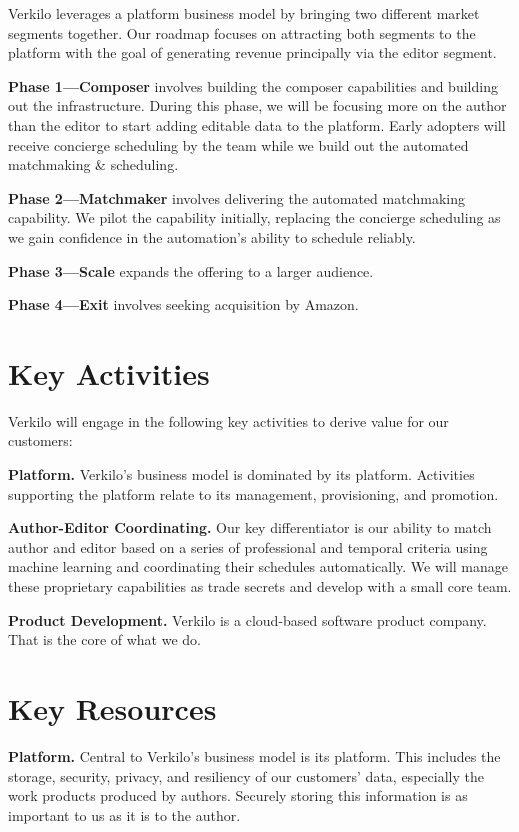 \documentclass[10pt,openany]{book}
\begin{document}
Verkilo leverages a platform business model by bringing two different
market segments together. Our roadmap focuses on attracting both
segments to the platform with the goal of generating revenue principally
via the editor segment.

\textbf{Phase 1---Composer} involves building the composer capabilities
and building out the infrastructure. During this phase, we will be
focusing more on the author than the editor to start adding editable
data to the platform. Early adopters will receive concierge scheduling
by the team while we build out the automated matchmaking \& scheduling.

\textbf{Phase 2---Matchmaker} involves delivering the automated
matchmaking capability. We pilot the capability initially, replacing the
concierge scheduling as we gain confidence in the automation's ability
to schedule reliably.

\textbf{Phase 3---Scale} expands the offering to a larger audience.

\textbf{Phase 4---Exit} involves seeking acquisition by Amazon.

\hypertarget{key-activities}{%
\section{Key Activities}\label{key-activities}}

Verkilo will engage in the following key activities to derive value for
our customers:

\textbf{Platform.} Verkilo's business model is dominated by its
platform. Activities supporting the platform relate to its management,
provisioning, and promotion.

\textbf{Author-Editor Coordinating.} Our key differentiator is our
ability to match author and editor based on a series of professional and
temporal criteria using machine learning and coordinating their
schedules automatically. We will manage these proprietary capabilities
as trade secrets and develop with a small core team.

\textbf{Product Development.} Verkilo is a cloud-based software product
company. That is the core of what we do.

\hypertarget{key-resources}{%
\section{Key Resources}\label{key-resources}}

\textbf{Platform.} Central to Verkilo's business model is its platform.
This includes the storage, security, privacy, and resiliency of our
customers' data, especially the work products produced by authors.
Securely storing this information is as important to us as it is to the
author.
\end{document}
